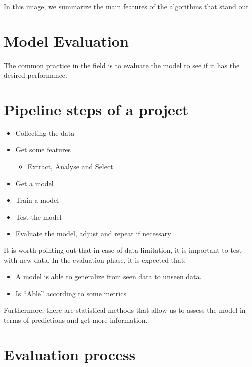 In this image, we summarize the main features of the algorithms that stand out

\section{Model Evaluation}
\paragraph{} The common practice in the field is to evaluate the model to see if it has the desired performance. 

\section{Pipeline steps of a project}
\begin{itemize}
\item  Collecting the data
\item Get some features
\begin{itemize}
\item  Extract, Analyse and Select
\end{itemize}
\end{itemize}
\begin{itemize}
\item Get a model
\item Train a model
\item Test the model
\item Evaluate the model, adjust and repeat if necessary
\end{itemize}

It is worth pointing out that in case of data limitation, it is important to test with new data. In the evaluation phase, it is expected that:
\begin{itemize}
\item A model is able to generalize from seen data to unseen data.
\item Is “Able” according to some metrics
\end{itemize}

Furthermore, there are statistical methods that allow us to assess the model in terms of predictions and get more information.

\section{Evaluation process}

